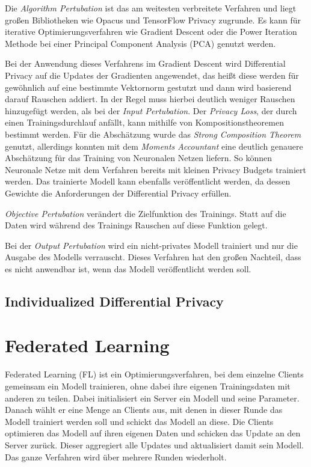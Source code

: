 Die \textit{Algorithm Pertubation} ist das am weitesten verbreitete Verfahren und liegt großen Bibliotheken wie Opacus\cite{yousefpour:2021} und TensorFlow Privacy\cite{tfprivacy} zugrunde. Es kann für iterative Optimierungsverfahren wie Gradient Descent oder die Power Iteration Methode bei einer Principal Component Analysis (PCA) genutzt werden. 

Bei der Anwendung dieses Verfahrens im Gradient Descent wird Differential Privacy auf die Updates der Gradienten angewendet, das heißt diese werden für gewöhnlich auf eine bestimmte Vektornorm gestutzt und dann wird basierend darauf Rauschen addiert. In der Regel muss hierbei deutlich weniger Rauschen hinzugefügt werden, als bei der \textit{Input Pertubation}.\cite{chang:2023} Der \textit{Privacy Loss}, der durch einen Trainingsdurchlauf anfällt, kann mithilfe von Kompositionstheoremen bestimmt werden. Für die Abschätzung wurde das \textit{Strong Composition Theorem}\cite{dwork:2010} genutzt, allerdings konnten \textcite{abadi:2016} mit dem \textit{Moments Accountant} eine deutlich genauere Abschätzung für das Training von Neuronalen Netzen liefern. So können Neuronale Netze mit dem Verfahren bereits mit kleinen Privacy Budgets trainiert werden. Das trainierte Modell kann ebenfalls veröffentlicht werden, da dessen Gewichte die Anforderungen der Differential Privacy erfüllen.

\textit{Objective Pertubation} verändert die Zielfunktion des Trainings. Statt auf die Daten wird während des Trainings Rauschen auf diese Funktion gelegt.

Bei der \textit{Output Pertubation} wird ein nicht-privates Modell trainiert und nur die Ausgabe des Modells verrauscht. Dieses Verfahren hat den großen Nachteil, dass es nicht anwendbar ist, wenn das Modell veröffentlicht werden soll.

\subsection{Individualized Differential Privacy}



\section{Federated Learning}

Federated Learning (FL) ist ein Optimierungsverfahren, bei dem einzelne Clients gemeinsam ein Modell trainieren, ohne dabei ihre eigenen Trainingsdaten mit anderen zu teilen. Dabei initialisiert ein Server ein Modell und seine Parameter. Danach wählt er eine Menge an Clients aus, mit denen in dieser Runde das Modell trainiert werden soll und schickt das Modell an diese. Die Clients optimieren das Modell auf ihren eigenen Daten und schicken das Update an den Server zurück. Dieser aggregiert alle Updates und aktualisiert damit sein Modell. Das ganze Verfahren wird über mehrere Runden wiederholt. 

